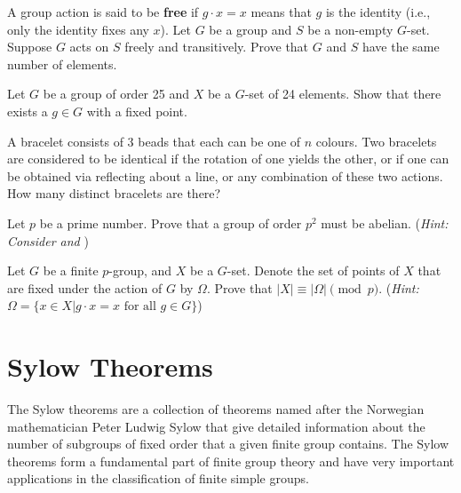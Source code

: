 \begin{problem}
    A group action is said to be \textbf{free} if $g\cdot x = x$ means that $g$ is the identity (i.e., only the identity fixes any $x$).\newline
    Let $G$ be a group and $S$ be a non-empty $G$-set. Suppose $G$ acts on $S$ freely and transitively. Prove that $G$ and $S$ have the same number of elements.
\end{problem}

\begin{problem}
    Let $G$ be a group of order 25 and $X$ be a $G$-set of 24 elements. Show that there exists a $g \in G$ with a fixed point.
\end{problem}

\begin{problem}
    A bracelet consists of 3 beads that each can be one of $n$ colours. Two bracelets are considered to be identical if the rotation of one yields the other, or if one can be obtained via reflecting about a line, or any combination of these two actions. How many distinct bracelets are there?
\end{problem}

\begin{problem}\label{problem-group-of-order-prime-squared-is-abelian}
    Let $p$ be a prime number. Prove that a group of order $p^2$ must be abelian.\newline
    (\textit{Hint: Consider  and })
\end{problem}

\newpage

\begin{problem}
    Let $G$ be a finite $p$-group, and $X$ be a $G$-set. Denote the set of points of $X$ that are fixed under the action of $G$ by $\Omega$. Prove that $|X| \equiv |\Omega| \pmod p$.\newline
    (\textit{Hint: $\Omega = \{x \in X \vert g\cdot x = x \textrm{ for all } g \in G\}$})
\end{problem}

\chapter{Sylow Theorems}
The Sylow theorems are a collection of theorems named after the Norwegian mathematician Peter Ludwig Sylow that give detailed information about the number of subgroups of fixed order that a given finite group contains. The Sylow theorems form a fundamental part of finite group theory and have very important applications in the classification of finite simple groups.

